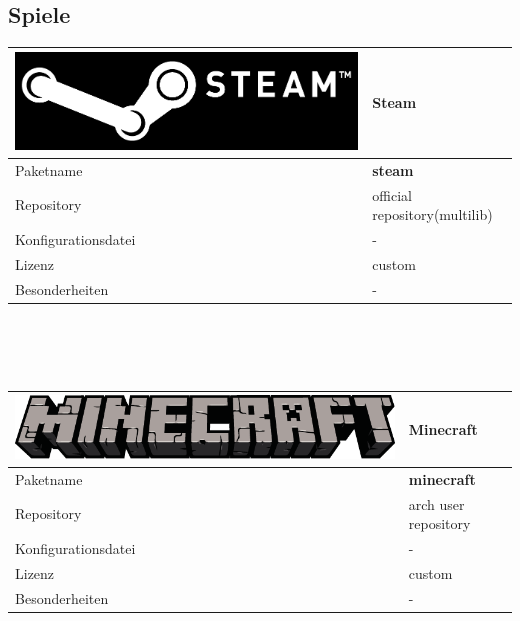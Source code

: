\subsection{Spiele}
\begin{tabular}{l|l}
\includegraphics[scale=0.25]{steam-logo.pdf} & Steam \\ \hline
Paketname & \textbf{steam} \\ 
Repository & official repository(multilib) \\
Konfigurationsdatei & - \\
Lizenz & custom \\
Besonderheiten & - \\
\end{tabular}
\\ \\ \\
\begin{tabular}{l|l}
\includegraphics[scale=0.25]{minecraft-logo.pdf} & Minecraft \\ \hline
Paketname & \textbf{minecraft} \\ 
Repository & arch user repository \\
Konfigurationsdatei & - \\
Lizenz & custom \\
Besonderheiten & - \\
\end{tabular}


